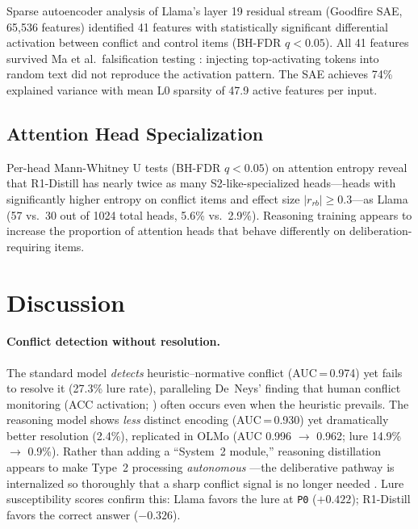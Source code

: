 \documentclass[accepted]{article}
\newcommand{\stwo}{S2-like}
\newcommand{\pzero}{\texttt{P0}}
\begin{document}
Sparse autoencoder analysis of Llama's layer 19 residual stream (Goodfire SAE, 65,536 features) identified 41 features with statistically significant differential activation between conflict and control items (BH-FDR $q < 0.05$). All 41 features survived Ma et al.\ falsification testing \citep{ma2026falsification}: injecting top-activating tokens into random text did not reproduce the activation pattern. The SAE achieves 74\% explained variance with mean L0 sparsity of 47.9 active features per input.

\subsection{Attention Head Specialization}
\label{sec:results_attention}

Per-head Mann-Whitney U tests (BH-FDR $q < 0.05$) on attention entropy reveal that R1-Distill has nearly twice as many \stwo{}-specialized heads---heads with significantly higher entropy on conflict items and effect size $|r_{rb}| \geq 0.3$---as Llama (57 vs.\ 30 out of 1024 total heads, 5.6\% vs.\ 2.9\%). Reasoning training appears to increase the proportion of attention heads that behave differently on deliberation-requiring items.


\section{Discussion}
\label{sec:discussion}

\paragraph{Conflict detection without resolution.}
The standard model \emph{detects} heuristic--normative conflict
(AUC\,=\,0.974) yet fails to resolve it (27.3\% lure rate), paralleling
De~Neys' finding \citep{deneys2012bias, deneys2017dual} that human
conflict monitoring (ACC activation; \citealp{botvinick2001conflict})
often occurs even when the heuristic prevails.
The reasoning model shows \emph{less} distinct encoding (AUC\,=\,0.930)
yet dramatically better resolution (2.4\%), replicated in OLMo
(AUC 0.996 $\to$ 0.962; lure 14.9\% $\to$ 0.9\%).  Rather than adding
a ``System~2 module,'' reasoning distillation appears to make Type~2
processing \emph{autonomous} \citep{evans2019reflections}---the
deliberative pathway is internalized so thoroughly that a sharp conflict
signal is no longer needed \citep{venhoff2025base}.  Lure susceptibility
scores confirm this: Llama favors the lure at \pzero{} ($+0.422$);
R1-Distill favors the correct answer ($-0.326$).
\end{document}
